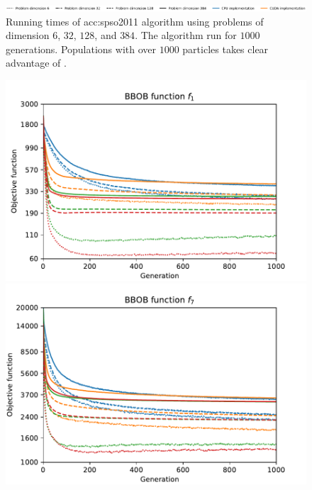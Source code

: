 \begin{figure}[ht!]
\begin{minipage}[t]{0.32\textwidth}
    \end{minipage}

    \begin{minipage}{\textwidth}
        \centering
        \includegraphics[width=\textwidth]{img/runs/time_pso2011_alldim_legend.pdf}
    \end{minipage}

    \caption[PSO2011 running times]{Running times of \acrlong{acc:spso2011} algorithm using problems of dimension $6$, $32$, $128$, and $384$. The algorithm run for $1000$ generations. Populations with over $1000$ particles takes clear advantage of \gpu.}
\end{figure}

\begin{figure}[ht!]
    \centering
    \begin{minipage}[t]{0.32\textwidth}
        \centering
        \includegraphics[width=\textwidth]{img/runs/fitness_pso2011_f1.pdf}
    \end{minipage}
    \hfill
    \begin{minipage}[t]{0.32\textwidth}
        \centering
        \includegraphics[width=\textwidth]{img/runs/fitness_pso2011_f7.pdf}

\end{minipage}
\end{figure}
